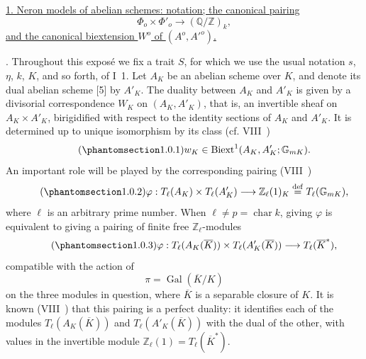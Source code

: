 
\medskip
\noindent
\underline{1. Neron models of abelian schemes: notation; the canonical pairing}
\[
 \Phi_o\times\Phi'_o\longrightarrow(\mathbb Q/\mathbb Z)_k,
\]
\underline{and the canonical biextension $W^o$ of $(A^o,{A'}^o)$.}

\medskip
\noindent
{}. Throughout this expos\'e we fix a trait $S$, for which we use the
usual notation $s$, $\eta$, $k$, $K$, and so forth, of I~1.  Let $A_K$
be an abelian scheme over $K$, and denote its dual abelian scheme [5] by
$A'_K$.  The duality between $A_K$ and $A'_K$ is given by a divisorial
correspondence $W_K$ on $(A_K,A'_K)$, that is, an invertible sheaf on
$A_K\times A'_K$, birigidified with respect to the identity sections of
$A_K$ and $A'_K$.  It is determined up to unique isomorphism by its
class (cf. VIII~)
\begin{equation}\tag{\SGARefTarget{sga7.sga7i.eix.n1-0-1}{1.0.1}}
 w_K\in\mathrm{Biext}^1(A_K,A'_K;\mathbb G_{mK}).
\end{equation}
An important role will be played by the corresponding pairing
(VIII~)
\begin{equation}\tag{\SGARefTarget{sga7.sga7i.eix.n1-0-2}{1.0.2}}
 \varphi:T_\ell(A_K)\times T_\ell(A'_K)
 \longrightarrow\mathbb Z_\ell(1)_K
 \overset{\mathrm{def}}{=}T_\ell(\mathbb G_{mK}),
\end{equation}
where $\ell$ is an arbitrary prime number.  When
$\ell\ne p=\operatorname{char}k$, giving $\varphi$ is equivalent to
giving a pairing of finite free $\mathbb Z_\ell$-modules
\begin{equation}\tag{\SGARefTarget{sga7.sga7i.eix.n1-0-3}{1.0.3}}
 \varphi:T_\ell(A_K(\overline K))\times
 T_\ell(A'_K(\overline K))\longrightarrow T_\ell(\overline K^*),
\end{equation}
compatible with the action of
\[
 \pi=\operatorname{Gal}(\overline K/K)
\]
on the three modules in question, where $\overline K$ is a separable
closure of $K$.  It is known (VIII~) that this pairing is a perfect
duality: it identifies each of the modules
$T_\ell(A_K(\overline K))$ and $T_\ell(A'_K(\overline K))$ with the
dual of the other, with values in the invertible module
$\mathbb Z_\ell(1)=T_\ell(\overline K^*)$.

